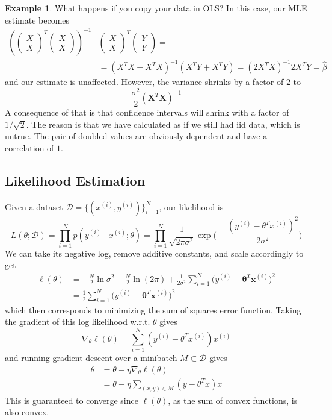 \documentclass{article}
\theoremstyle{definition}
\newtheorem{example}{Example}[section]
\theoremstyle{remark}
\theoremstyle{definition}
\begin{document}
\begin{example}
What happens if you copy your data in OLS? In this case, our MLE estimate becomes 
\begin{align*}
    \left(\begin{pmatrix}X \\ X \end{pmatrix}^T \begin{pmatrix} X \\ X \end{pmatrix} \right )^{-1} & \begin{pmatrix} X \\ X  \end{pmatrix}^T \begin{pmatrix} Y \\ Y  \end{pmatrix}  =\\
& = (X^T X + X^T X)^{-1} (X^T Y + X^T Y ) = (2 X^T X)^{-1} 2 X^T Y = \hat{\beta}
\end{align*}
and our estimate is unaffected. However, the variance shrinks by a factor of $2$ to 
\[\frac{\sigma^2}{2} (\mathbf{X}^T \mathbf{X})^{-1}\]
A consequence of that is that confidence intervals will shrink with a factor of $1/\sqrt{2}$. The reason is that we have calculated as if we still had iid data, which is untrue. The pair of doubled values are obviously dependent and have a correlation of $1$. 
\end{example}

\subsection{Likelihood Estimation}

Given a dataset $\mathcal{D} = \{(x^{(i)}, y^{(i)})\}_{i=1}^N$, our likelihood is 
\[L(\theta ; \mathcal{D}) = \prod_{i=1}^N p(y^{(i)} \mid x^{(i)}; \theta) = \prod_{i=1}^N \frac{1}{\sqrt{2 \pi \sigma^2}} \exp \bigg( -\frac{(y^{(i)} - \theta^T x^{(i)})^2}{2 \sigma^2} \bigg)\]
We can take its negative log, remove additive constants, and scale accordingly to get 
\begin{align*}
    \ell (\theta) & = -\frac{N}{2} \ln{\sigma^2} - \frac{N}{2} \ln(2 \pi) + \frac{1}{2 \sigma^2} \sum_{i=1}^N \big(y^{(i)} - \boldsymbol{\theta}^T \mathbf{x}^{(i)} \big)^2 \\
    & =\frac{1}{2} \sum_{i=1}^N \big(y^{(i)} - \boldsymbol{\theta}^T \mathbf{x}^{(i)} \big)^2 
\end{align*}
which then corresponds to minimizing the sum of squares error function. Taking the gradient of this log likelihood w.r.t. $\theta$ gives 
\[\nabla_\theta \ell (\theta) = \sum_{i=1}^N ( y^{(i)} - \theta^T x^{(i)}) x^{(i)} \]
and running gradient descent over a minibatch $M \subset \mathcal{D}$ gives 
\begin{align*}
    \theta & = \theta - \eta \nabla_\theta \ell (\theta) \\
    & = \theta - \eta \sum_{(x, y) \in M} (y - \theta^T x) x
\end{align*}
This is guaranteed to converge since $\ell(\theta)$, as the sum of convex functions, is also convex. 
\end{document}

